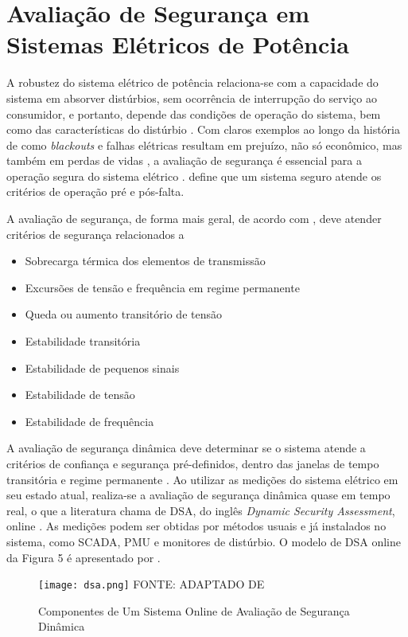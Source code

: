 \documentclass[12pt,oneside,a4paper,chapter=TITLE,section=TITLE,sumario=tradicional,english,brazil]{abntex2}
\begin{document}
\section{Avaliação de Segurança em Sistemas Elétricos de Potência}
A robustez do sistema elétrico de potência relaciona-se com a capacidade do sistema em absorver distúrbios, sem ocorrência de interrupção do serviço ao consumidor, e portanto, depende das condições de operação do sistema, bem como das características do distúrbio \cite{kundur2004}. Com claros exemplos ao longo da história de como \textit{blackouts} e falhas elétricas resultam em prejuízo, não só econômico, mas também em perdas de vidas \cite{saha2009}, a avaliação de segurança é essencial para a operação segura do sistema elétrico \cite{kundur2004}. \textcite{kundur2004} define que um sistema seguro atende os critérios de operação pré e pós-falta.\par
A avaliação de segurança, de forma mais geral, de acordo com \textcite{kundur2004}, deve atender critérios de segurança relacionados a
\begin{itemize}
\item Sobrecarga térmica dos elementos de transmissão
\item Excursões de tensão e frequência em regime permanente
\item Queda ou aumento transitório de tensão
\item Estabilidade transitória
\item Estabilidade de pequenos sinais
\item Estabilidade de tensão
\item Estabilidade de frequência
\end{itemize}
\par 
A avaliação de segurança dinâmica deve determinar se o sistema atende a critérios de confiança e segurança pré-definidos, dentro das janelas de tempo transitória e regime permanente \cite{kundur2004}. Ao utilizar as medições do sistema elétrico em seu estado atual, realiza-se a avaliação de segurança dinâmica quase em tempo real, o que a literatura chama de DSA, do inglês \textit{Dynamic Security Assessment}, online \textcite{kundur2004}. As medições podem ser obtidas por métodos usuais e já instalados no sistema, como SCADA, PMU e monitores de distúrbio. O modelo de DSA online da Figura 5 é apresentado por \textcite{wang2012}.
\begin{figure}[ht!]
\centering
\caption{Componentes de Um Sistema Online de Avaliação de Segurança Dinâmica}
\texttt{[image: dsa.png]}
FONTE: ADAPTADO DE \cite{wang2012}
\end{figure}
\end{document}
